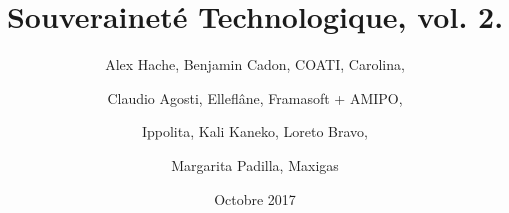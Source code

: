 \title{Souveraineté Technologique, vol. 2.}
\author{
	Alex Hache, Benjamin Cadon, COATI, Carolina, \and 
	Claudio Agosti, Elleflâne, Framasoft + AMIPO, \and
	Ippolita, Kali Kaneko, Loreto Bravo,\and
	Margarita Padilla, Maxigas } 
\date{Octobre 2017}
